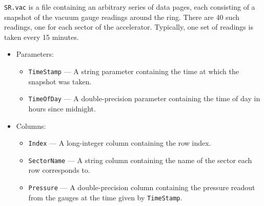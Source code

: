 \documentclass[11pt]{article}
\begin{document}
{\tt SR.vac} is a file containing an arbitrary series of data pages, each
consisting of a snapshot of the vacuum gauge readings around the ring.
There are 40 such readings, one for each sector of the accelerator.
Typically, one set of readings is taken every 15 minutes.
\begin{itemize}
\item Parameters:
        \begin{itemize}
        \item {\tt TimeStamp} --- A string parameter containing the time at which the snapshot was taken.
        \item {\tt TimeOfDay} --- A double-precision parameter containing the time of day in hours since midnight.
        \end{itemize}
\item Columns:
        \begin{itemize}
        \item {\tt Index} --- A long-integer column containing the row index.
        \item {\tt SectorName} --- A string column containing the name of the sector each row corresponds to.
        \item {\tt Pressure} --- A double-precision column containing the pressure readout from the gauges at
                the time given by {\tt TimeStamp}.
        \end{itemize}
\end{itemize}
\end{document}
